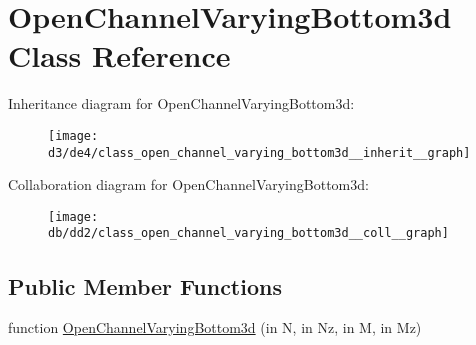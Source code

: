\hypertarget{class_open_channel_varying_bottom3d}{}\section{Open\+Channel\+Varying\+Bottom3d Class Reference}
\label{class_open_channel_varying_bottom3d}


Inheritance diagram for Open\+Channel\+Varying\+Bottom3d\+:
\nopagebreak
\begin{figure}[H]
\begin{center}
\leavevmode
\texttt{[image: d3/de4/class\_open\_channel\_varying\_bottom3d\_\_inherit\_\_graph]}
\end{center}
\end{figure}


Collaboration diagram for Open\+Channel\+Varying\+Bottom3d\+:
\nopagebreak
\begin{figure}[H]
\begin{center}
\leavevmode
\texttt{[image: db/dd2/class\_open\_channel\_varying\_bottom3d\_\_coll\_\_graph]}
\end{center}
\end{figure}
\subsection*{Public Member Functions}
\begin{DoxyCompactItemize}
\item 
function \hyperlink{class_open_channel_varying_bottom3d_a9c4a1f31bd6e8a1856d97713d1223263}{Open\+Channel\+Varying\+Bottom3d} (in N, in Nz, in M, in Mz)
\end{DoxyCompactItemize}
